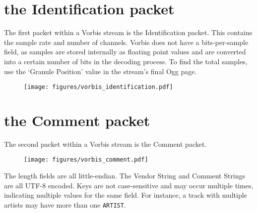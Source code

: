 \section{the Identification packet}
The first packet within a Vorbis stream is the Identification packet.
This contains the sample rate and number of channels.
Vorbis does not have a bits-per-sample field, as samples
are stored internally as floating point values and are
converted into a certain number of bits in the decoding process.
To find the total samples, use the `Granule Position' value
in the stream's final Ogg page.
\begin{figure}[h]
\texttt{[image: figures/vorbis\_identification.pdf]}
\end{figure}

\clearpage

\section{the Comment packet}
\label{vorbiscomment}
The second packet within a Vorbis stream is the Comment packet.

\begin{figure}[h]
\texttt{[image: figures/vorbis\_comment.pdf]}
\end{figure}

The length fields are all little-endian.
The Vendor String and Comment Strings are all UTF-8 encoded.
Keys are not case-sensitive and may occur multiple times,
indicating multiple values for the same field.
For instance, a track with multiple artists may have
more than one \texttt{ARTIST}.

